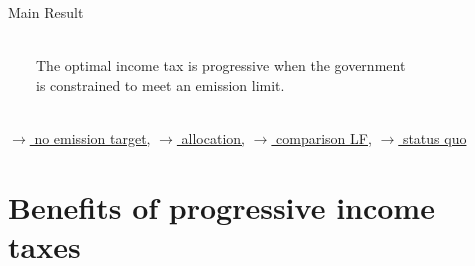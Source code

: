 \documentclass[11pt,aspectratio=169]{beamer}
\begin{document}
\begin{frame}{Main Result}
\begin{minipage}[]{0.32\textwidth}
\end{minipage}
\vspace{5mm}
\begin{block}{}
	\ \\
	\ \ \ \  The optimal income tax is progressive when the government  \\ \ \ \ \ is constrained to meet an emission limit. \  \ \\ \ 
\end{block}
	\vspace{-2mm}
\hfill
\hyperlink{notopt}{\tiny{$\rightarrow$ no emission target,}} 
\hyperlink{alloc}{\tiny{$\rightarrow$ allocation,}} 
\hyperlink{allocLF}{\tiny{$\rightarrow$ comparison LF,}} 
\hyperlink{sq}{\tiny{$\rightarrow$ status quo}} 
\hypertarget{backmainres}{}
\end{frame}




\hypertarget{benf}{}
\section*{Benefits of progressive income taxes}
\end{document}
